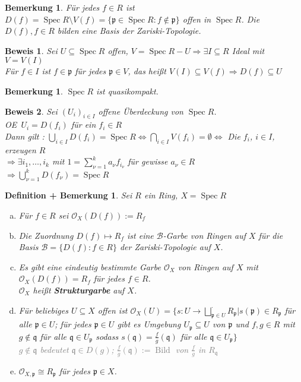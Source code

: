 \documentclass[a4paper,12pt]{report}
\theoremstyle{break}
\newtheorem{DefBem}[Def]{Definition + Bemerkung}
\newtheorem{Bem}[Def]{Bemerkung}
\theoremstyle{nonumberbreak}
\newtheorem{bew}{Beweis}
\theoremstyle{nonumberplain}
\newcommand{\emp}[1]{\textbf{\emph{#1}}}
\newcommand{\defterm}[1]{{\index{#1}}\emp{#1}}
\DeclareMathOperator{\Spec}{Spec}
\DeclareMathOperator{\Bild}{Bild}
\newcommand{\calB}{\mathcal{B}}
\newcommand{\calO}{\mathcal{O}}
\newcommand{\p}{\mathfrak{p}}
\newcommand{\q}{\mathfrak{q}}
\renewcommand{\OE}{O\!\!E~}
\begin{document}
\begin{Bem}
F\"ur jedes $f\in R$ ist $D(f) = \Spec R\setminus V(f) = \{\p \in \Spec R : f \notin \p\}$ offen in $\Spec R$. Die $D(f), f\in R$ bilden eine Basis der Zariski-Topologie.
\end{Bem}

\begin{bew}
Sei $U\subseteq \Spec R$ offen, $V= \Spec R - U \Rightarrow \exists I \subseteq R$ Ideal mit $V=V(I)$\\
F\"ur $f\in I$ ist $f\in \p$ f\"ur jedes $\p \in V$, das hei\ss t $V(I) \subseteq V(f) \Rightarrow D(f) \subseteq U$
\end{bew}

\begin{Bem}
$\Spec R$ ist quasikompakt.
\end{Bem}

\begin{bew}
Sei $(U_i)_{i\in I}$ offene \"Uberdeckung von $\Spec R$.\\
\OE $U_i = D(f_i)$ f\"ur ein $f_i\in R$\\
Dann gilt : $\bigcup\limits_{i\in I}D(f_i) = \Spec R \Leftrightarrow\bigcap\limits_{i\in I}V(f_i) = \emptyset \Leftrightarrow$ Die $f_i$, $i \in I$, erzeugen $R$\\
$\Rightarrow \exists i_1,\ldots ,i_k$ mit $1=\sum\limits_{\nu=1}^k a_\nu f_{i_\nu}$ f\"ur gewisse $a_\nu \in R$\\
$\Rightarrow \bigcup\limits_{\nu = 1}^k D(f_\nu) = \Spec R$
\end{bew}

\begin{DefBem}
Sei $R$ ein Ring, $X = \Spec R$
\begin{enumerate}[a)]
\item
	F\"ur $f \in R$ sei $\calO_X(D(f)) := R_f$
\item
	Die Zuordnung $D(f) \mapsto R_f$ ist eine $\calB$-Garbe von Ringen auf $X$ f\"ur die Basis $\calB = \{D(f): f\in R\}$ der Zariski-Topologie auf $X$.
\item
	Es gibt eine eindeutig bestimmte Garbe $\calO_X$ von Ringen auf $X$ mit $\calO_X(D(f)) = R_f$ f\"ur jedes $f\in R$.\\
	$\calO_X$ hei\ss t \defterm{Strukturgarbe} auf $X$.
\item
	F\"ur beliebiges $U\subseteq X$ offen ist $\calO_X(U) = \{ s: U \to \bigsqcup\limits_{\p\in U}^{\cdot} R_\p \vert s(\p) \in R_\p$ f\"ur alle $\p \in U$; f\"ur jedes $\p \in U$ gibt es Umgebung $U_\p \subseteq U$ von $\p$ und $f,g \in R$ mit $g\notin \q$ f\"ur alle $\q \in U_\p$ sodass $s(\q) = \frac{f}{g}(\q)$ f\"ur alle $\q \in U_\p\}$\\
	\textcolor{gray}{$g\notin \q$ bedeutet $\q \in D(g)$; $\frac{f}{g}(\q) := \Bild$ von $\frac{f}{g}$ in $R_\q$}
\item
	$\calO_{X,\p} \cong R_\p$ f\"ur jedes $\p \in X$.
\end{enumerate}\end{DefBem}
\end{document}
